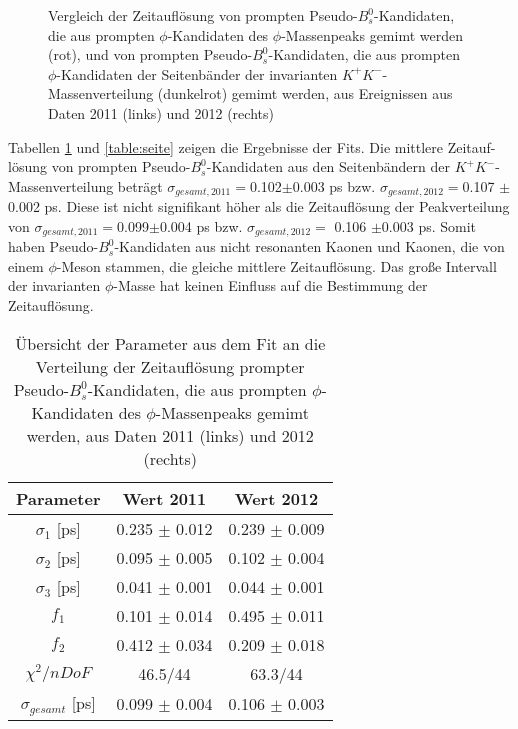 \documentclass{article}
\begin{document}
\begin{figure}[h!]
\caption{Vergleich der Zeitauflösung von prompten Pseudo-$B_s^0$-Kandidaten, die aus prompten $\phi$-Kandidaten des $\phi$-Massenpeaks gemimt werden (rot), und von prompten Pseudo-$B_s^0$-Kandidaten, die aus prompten $\phi$-Kandidaten der Seitenbänder der invarianten $K^+K^-$-Massenverteilung (dunkelrot) gemimt werden, aus Ereignissen aus Daten 2011 (links) und 2012 (rechts)}
\label{fig:tresseite}
\end{figure} 

Tabellen \ref{table:peak} und \ref{table:seite} zeigen die Ergebnisse der Fits. Die mittlere Zeitauf-lösung von prompten Pseudo-$B_s^0$-Kandidaten aus den Seitenbändern der $K^+K^-$-Massenverteilung beträgt $\sigma_{gesamt,2011}=$0.102$\pm$0.003 ps bzw. $\sigma_{gesamt,2012}=$0.107 $\pm$0.002 ps. Diese ist nicht signifikant höher als die Zeitauflösung der Peakverteilung von $\sigma_{gesamt,2011}=$0.099$\pm$0.004 ps bzw. $\sigma_{gesamt,2012}=$ 0.106 $\pm$0.003 ps. Somit haben Pseudo-$B_s^0$-Kandidaten aus nicht resonanten Kaonen und Kaonen, die von einem $\phi$-Meson stammen, die gleiche mittlere Zeitauflösung. Das große Intervall der invarianten $\phi$-Masse hat keinen Einfluss auf die Bestimmung der Zeitauflösung.

\begin{table}[h!]
\noindent \begin{centering}
\begin{tabular}{c|c|c}
Parameter&Wert 2011&Wert 2012\tabularnewline
\hline 
$\sigma_1$ [ps] & 0.235 $\pm$ 0.012 & 0.239 $\pm$ 0.009 \tabularnewline
$\sigma_2$ [ps]& 0.095 $\pm$ 0.005  & 0.102 $\pm$ 0.004 \tabularnewline
$\sigma_3$ [ps]& 0.041 $\pm$ 0.001 & 0.044 $\pm$ 0.001 \tabularnewline%
$f_1$ & 0.101 $\pm$ 0.014 & 0.495 $\pm$ 0.011   \tabularnewline
$f_2$ & 0.412 $\pm$ 0.034 &0.209 $\pm$ 0.018 \tabularnewline
\hline
$\chi^2/nDoF$ & 46.5/44 &63.3/44\tabularnewline
\hline
$\sigma_{gesamt}$ [ps]&0.099 $\pm$ 0.004&0.106 $\pm$ 0.003 \tabularnewline
\end{tabular}
\par \end{centering}
\caption{Übersicht der Parameter aus dem Fit an die Verteilung der Zeitauflösung prompter Pseudo-$B_s^0$-Kandidaten, die aus prompten $\phi$-Kandidaten des $\phi$-Massenpeaks gemimt werden, aus Daten 2011 (links) und 2012 (rechts)}
\label{table:peak}
\end{table}
\end{document}

